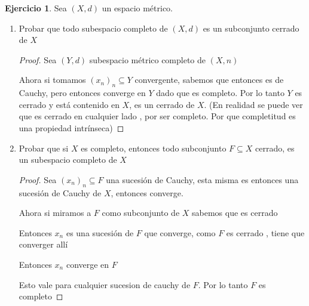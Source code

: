 \documentclass[11pt]{report}
\theoremstyle{definition}
\newtheorem{ej}{Ejercicio}
\begin{document}
	\begin{ej}
		Sea $(X,d)$ un espacio métrico.
		\begin{enumerate}
			\item Probar que todo subespacio completo de $(X,d)$ es un subconjunto cerrado de $X$
				\begin{proof}
					Sea $(Y,d)$ subespacio métrico completo de $(X,n)$

					Ahora si tomamos $(x_n)_n \subseteq Y$ convergente, sabemos que entonces es de Cauchy, pero entonces converge en $Y$ dado que es completo. Por lo tanto $Y$ es cerrado y está contenido en $X$, es un cerrado de $X$. (En realidad se puede ver que es cerrado en cualquier lado , por ser completo. Por que completitud es una propiedad intrínseca)
				\end{proof}

			\item Probar que si $X$ es completo, entonces todo subconjunto $F\subseteq X$ cerrado, es un subespacio completo de $X$
				\begin{proof}
					Sea $(x_n)_n \subseteq F$ una sucesión de Cauchy, esta misma es entonces una sucesión de Cauchy de $X$, entonces converge.

					Ahora si miramos a $F$ como subconjunto de $X$ sabemos que es cerrado

					Entonces $x_n$ es una sucesión de $F$ que converge, como $F$ es cerrado , tiene que converger allí

					Entonces $x_n$ converge en $F$

					Esto vale para cualquier sucesion de cauchy de $F$. Por lo tanto $F$ es completo

				\end{proof}
		\end{enumerate}
	\end{ej}
	
\end{document}
